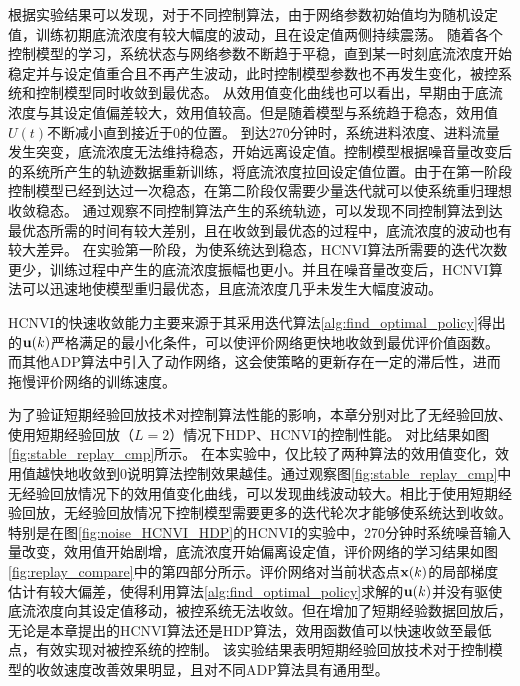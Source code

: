 根据实验结果可以发现，对于不同控制算法，由于网络参数初始值均为随机设定值，训练初期底流浓度有较大幅度的波动，且在设定值两侧持续震荡。
随着各个控制模型的学习，系统状态与网络参数不断趋于平稳，直到某一时刻底流浓度开始稳定并与设定值重合且不再产生波动，此时控制模型参数也不再发生变化，被控系统和控制模型同时收敛到最优态。
从效用值变化曲线也可以看出，早期由于底流浓度与其设定值偏差较大，效用值较高。但是随着模型与系统趋于稳态，效用值${U}(t)$不断减小直到接近于0的位置。
%
到达270分钟时，系统进料浓度、进料流量发生突变，底流浓度无法维持稳态，开始远离设定值。控制模型根据噪音量改变后的系统所产生的轨迹数据重新训练，将底流浓度拉回设定值位置。由于在第一阶段控制模型已经到达过一次稳态，在第二阶段仅需要少量迭代就可以使系统重归理想收敛稳态。
通过观察不同控制算法产生的系统轨迹，可以发现不同控制算法到达最优态所需的时间有较大差别，且在收敛到最优态的过程中，底流浓度的波动也有较大差异。
在实验第一阶段，为使系统达到稳态，HCNVI算法所需要的迭代次数更少，训练过程中产生的底流浓度振幅也更小。并且在噪音量改变后，HCNVI算法可以迅速地使模型重归最优态，且底流浓度几乎未发生大幅度波动。

HCNVI的快速收敛能力主要来源于其采用迭代算法\ref{alg:find_optimal_policy}得出的${\mathbf
u}(k)$严格满足的最小化条件，可以使评价网络更快地收敛到最优评价值函数。而其他ADP算法中引入了动作网络，这会使策略的更新存在一定的滞后性，进而拖慢评价网络的训练速度。

为了验证短期经验回放技术对控制算法性能的影响，本章分别对比了无经验回放、使用短期经验回放（$L=2$）情况下HDP、HCNVI的控制性能。
对比结果如图\ref{fig:stable_replay_cmp}所示。
在本实验中，仅比较了两种算法的效用值变化，效用值越快地收敛到0说明算法控制效果越佳。通过观察图\ref{fig:stable_replay_cmp}中无经验回放情况下的效用值变化曲线，可以发现曲线波动较大。相比于使用短期经验回放，无经验回放情况下控制模型需要更多的迭代轮次才能够使系统达到收敛。
特别是在图\ref{fig:noise_HCNVI_HDP}的HCNVI的实验中，270分钟时系统噪音输入量改变，效用值开始剧增，底流浓度开始偏离设定值，评价网络的学习结果如图\ref{fig:replay_compare}中的第四部分所示。评价网络对当前状态点$\mathbf
x(k)$的局部梯度估计有较大偏差，使得利用算法\ref{alg:find_optimal_policy}求解的${\mathbf u}(k)$并没有驱使底流浓度向其设定值移动，被控系统无法收敛。但在增加了短期经验数据回放后，无论是本章提出的HCNVI算法还是HDP算法，效用函数值可以快速收敛至最低点，有效实现对被控系统的控制。
该实验结果表明短期经验回放技术对于控制模型的收敛速度改善效果明显，且对不同ADP算法具有通用型。


